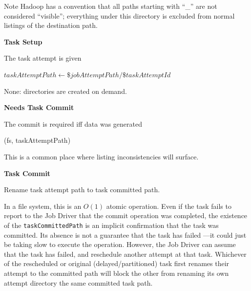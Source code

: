 \documentclass[conference]{IEEEtran}
\begin{document}
Note Hadoop has a convention that all paths starting with ``\_'' are not considered
``visible'';
everything under this directory is excluded from normal
listings of the destination path.


\textbf{Task Setup}

The task attempt is given

\begin{algorithmic}
  \STATE $taskAttemptPath \leftarrow \$jobAttemptPath/\$taskAttemptId$
\end{algorithmic}

None: directories are created on demand.


\textbf{Needs Task Commit}

The commit is required iff data was generated

\begin{function}
\caption{$needsTaskCommit()$}

  \exists(fs, taskAttemptPath)
\end{function}

This is a common place where listing inconsistencies will surface.


\textbf{Task Commit}

Rename task attempt path to task committed path.

\begin{procedure}[H]
\caption{$commitTask()$}
\end{procedure}


In a file system, this is an $O(1)$ atomic operation.
Even if the task fails to report to the Job Driver that the
commit operation was completed, the existence of the \texttt{taskCommittedPath}
is an implicit confirmation that the task was committed.
Its absence is not a guarantee that the task has failed ---it could just
be taking slow to execute the operation.
However, the Job Driver can assume that the task has failed,
and reschedule another attempt at that task.
Whichever of the rescheduled or original (delayed/partitioned) task
first renames their attempt to the committed path will block the other
from renaming its own attempt directory the same committed task path.
\end{document}
